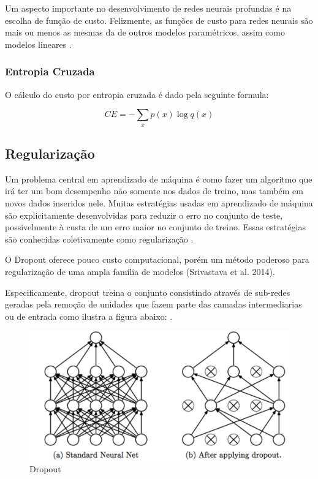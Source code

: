 \documentclass[12pt]{article}
\begin{document}
Um aspecto importante no desenvolvimento de redes neurais profundas é na escolha de função de custo. Felizmente, as funções de custo para redes neurais são mais ou menos as mesmas da de outros modelos paramétricos, assim como modelos lineares \cite{Goodfellow-et-al-2016}.

\subsubsection{Entropia Cruzada}

O cálculo do custo por entropia cruzada é dado pela seguinte formula:

\begin{equation}
    CE = -\sum\limits_{x} p(x)\log q(x)
\end{equation}

\subsection{Regularização}

Um problema central em aprendizado de máquina é como fazer um algoritmo que irá ter um bom desempenho não somente nos dados de treino, mas também em novos dados inseridos nele. Muitas estratégias usadas em aprendizado de máquina são explicitamente desenvolvidas para reduzir o erro no conjunto de teste, possivelmente à custa de um erro maior no conjunto de treino. Essas estratégias são conhecidas coletivamente como regularização \cite{Goodfellow-et-al-2016}.

O Dropout oferece pouco custo computacional, porém um método poderoso para regularização de uma ampla família de modelos (Srivastava et al. 2014).

Especificamente, dropout treina o conjunto consistindo através de sub-redes geradas pela remoção de unidades que fazem parte das camadas intermediarias ou de entrada como ilustra a figura abaixo: \cite{Goodfellow-et-al-2016}.

\begin{figure}[ht]
\centering
\includegraphics[width=.8\textwidth]{images/dropout.png}
\caption{Dropout}
\label{fig:dropout}
\end{figure}
\end{document}
